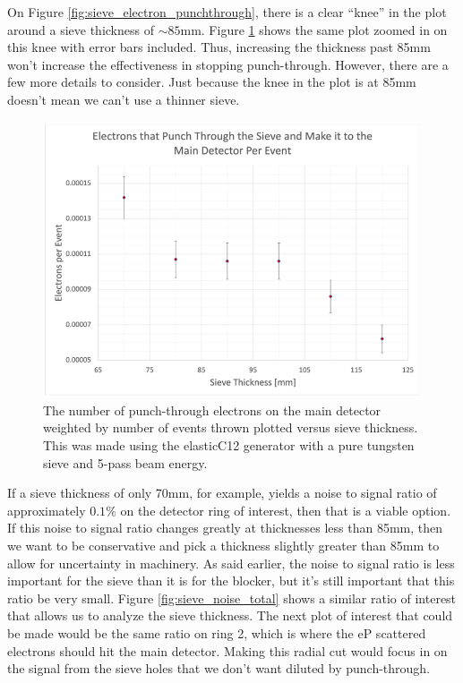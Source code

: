 On Figure \ref{fig:sieve_electron_punchthrough}, there is a clear ``knee'' in the plot around a sieve thickness of $\sim85$mm. Figure \ref{fig:sieve_electron_punchthrough_zoom} shows the same plot zoomed in on this knee with error bars included. Thus, increasing the thickness past 85mm won't increase the effectiveness in stopping punch-through. However, there are a few more details to consider. Just because the knee in the plot is at 85mm doesn't mean we can't use a thinner sieve. 

\begin{figure}[H]
    \centering
    \includegraphics[scale=0.4]{Images/PunchThroughPerEvent_ErrorBars_09162021.png}
    \caption{The number of punch-through electrons on the main detector weighted by number of events thrown plotted versus sieve thickness. This was made using the elasticC12 generator with a pure tungsten sieve and 5-pass beam energy.}
    \label{fig:sieve_electron_punchthrough_zoom}
\end{figure}

If a sieve thickness of only 70mm, for example, yields a noise to signal ratio of approximately $0.1\%$ on the detector ring of interest, then that is a viable option. If this noise to signal ratio changes greatly at thicknesses less than 85mm, then we want to be conservative and pick a thickness slightly greater than 85mm to allow for uncertainty in machinery. As said earlier, the noise to signal ratio is less important for the sieve than it is for the blocker, but it's still important that this ratio be very small. Figure \ref{fig:sieve_noise_total} shows a similar ratio of interest that allows us to analyze the sieve thickness. The next plot of interest that could be made would be the same ratio on ring 2, which is where the eP scattered electrons should hit the main detector. Making this radial cut would focus in on the signal from the sieve holes that we don't want diluted by punch-through.

